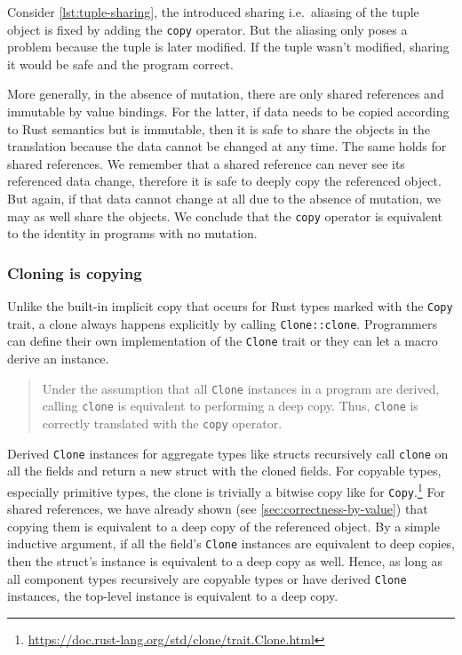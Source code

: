 Consider \autoref{lst:tuple-sharing}, the introduced sharing
i.e.~aliasing of the tuple object is fixed by adding the
\passthrough{\lstinline!copy!} operator. But the aliasing only poses a
problem because the tuple is later modified. If the tuple wasn't
modified, sharing it would be safe and the program correct.

More generally, in the absence of mutation, there are only shared
references and immutable by value bindings. For the latter, if data
needs to be copied according to Rust semantics but is immutable, then it
is safe to share the objects in the translation because the data cannot
be changed at any time. The same holds for shared references. We
remember that a shared reference can never see its referenced data
change, therefore it is safe to deeply copy the referenced object. But
again, if that data cannot change at all due to the absence of mutation,
we may as well share the objects. We conclude that the
\passthrough{\lstinline!copy!} operator is equivalent to the identity in
programs with no mutation.

\subsubsection{Cloning is copying}
\label{sec:clone-is-copy}

Unlike the built-in implicit copy that occurs for Rust types marked with
the \passthrough{\lstinline!Copy!} trait, a clone always happens
explicitly by calling \passthrough{\lstinline!Clone::clone!}.
Programmers can define their own implementation of the
\passthrough{\lstinline!Clone!} trait or they can let a macro derive an
instance.

\begin{quote}
Under the assumption that all \passthrough{\lstinline!Clone!} instances
in a program are derived, calling \passthrough{\lstinline!clone!} is
equivalent to performing a deep copy. Thus,
\passthrough{\lstinline!clone!} is correctly translated with the
\passthrough{\lstinline!copy!} operator.
\end{quote}

Derived \passthrough{\lstinline!Clone!} instances for aggregate types like
structs recursively call \passthrough{\lstinline!clone!} on all the fields and
return a new struct with the cloned fields. For copyable types, especially
primitive types, the clone is trivially a bitwise copy like for
\lstinline!Copy!.\footnote{\url{https://doc.rust-lang.org/std/clone/trait.Clone.html}}
For shared references, we have already shown (see
\autoref{sec:correctness-by-value}) that copying them is equivalent to a deep
copy of the referenced object. By a simple inductive argument, if all the
field's \passthrough{\lstinline!Clone!} instances are equivalent to deep copies,
then the struct's instance is equivalent to a deep copy as well. Hence, as long
as all component types recursively are copyable types or have derived
\passthrough{\lstinline!Clone!} instances, the top-level instance is equivalent
to a deep copy.

